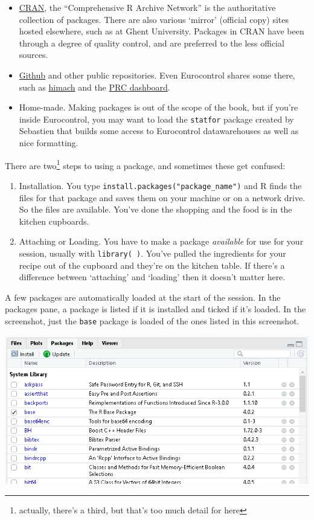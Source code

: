 \documentclass[
]{book}
\providecommand{\tightlist}{%
  \setlength{\itemsep}{0pt}\setlength{\parskip}{0pt}}
\begin{document}
\begin{itemize}
\tightlist
\item
  \href{https://cran.r-project.org}{CRAN}, the ``Comprehensive R Archive Network'' is the authoritative collection of packages. There are also various `mirror' (official copy) sites hosted elsewhere, such as at Ghent University. Packages in CRAN have been through a degree of quality control, and are preferred to the less official sources.
\item
  \href{https://github.com}{Github} and other public repositories. Even Eurocontrol shares some there, such as \href{https://github.com/david6marsh/himach}{himach} and the \href{https://github.com/euctrl-pru/portal}{PRC dashboard}.
\item
  Home-made. Making packages is out of the scope of the book, but if you're inside Eurocontrol, you may want to load the \texttt{statfor} package created by Sebastien that builds some access to Eurocontrol datawarehouses as well as nice formatting.
\end{itemize}

There are two\footnote{actually, there's a third, but that's too much detail for here} steps to using a package, and sometimes these get confused:

\begin{enumerate}
\def\labelenumi{\arabic{enumi})}
\tightlist
\item
  Installation. You type \texttt{install.packages("package\_name")} and R finds the files for that package and saves them on your machine or on a network drive. So the files are available. You've done the shopping and the food is in the kitchen cupboards.
\item
  Attaching or Loading. You have to make a package \emph{available} for use for your session, usually with \texttt{library(\ )}. You've pulled the ingredients for your recipe out of the cupboard and they're on the kitchen table. If there's a difference between `attaching' and `loading' then it doesn't matter here.
\end{enumerate}

A few packages are automatically loaded at the start of the session. In the packages pane, a package is listed if it is installed and ticked if it's loaded. In the screenshot, just the \texttt{base} package is loaded of the ones listed in this screenshot.

\includegraphics{images/packages.png}
\end{document}
